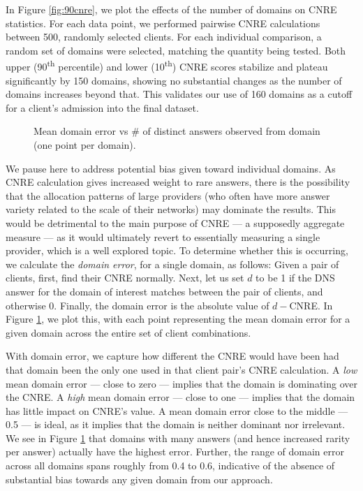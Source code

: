 In Figure \ref{fig:90cnre}, we plot the effects of the number of domains on CNRE
statistics. For each data point, we performed pairwise CNRE calculations between
500, randomly selected clients. For each individual comparison, a random set of
domains were selected, matching the quantity being tested. Both upper
(90\textsuperscript{th}
percentile) and lower (10\textsuperscript{th}) CNRE scores stabilize and plateau
significantly by 150 domains, showing no substantial changes as the
number of domains increases beyond that. This validates our use of 160 domains
as a cutoff for a client's admission into the final dataset.

\begin{figure}
    \caption{Mean domain error vs \# of distinct answers observed from domain
    (one point per domain).}
    \label{fig:domerr}
\end{figure}

We pause here to address potential bias given toward individual domains. As CNRE
calculation gives increased weight to rare answers, there is the possibility
that the allocation patterns of large providers (who often have more answer
variety related to the scale of their networks) may dominate the results. This
would be detrimental to the main purpose of CNRE --- a supposedly aggregate
measure --- as it would ultimately revert to essentially measuring a single
provider, which is a well explored topic. To determine whether this is occurring,
we calculate the \emph{domain error}, for a single domain, as follows: Given a
pair of clients, first, find their CNRE normally. Next, let us set $d$ to be 1
if the DNS answer for the domain of interest matches between the pair of
clients, and otherwise 0. Finally, the domain error is the absolute value of \(d
- \)CNRE. In Figure \ref{fig:domerr}, we plot this, with each
point representing the mean domain error for a given domain across
the entire set of client combinations. 

With domain error, we capture how different the CNRE would have
been had that domain been the only one used in that client pair's CNRE calculation. A \emph{low}
mean domain
error --- close to zero --- implies that the domain is dominating over the
CNRE. A \emph{high} mean domain error --- close to one --- implies that the domain has little impact
on CNRE's value. A mean domain error close to the middle --- 0.5 --- is ideal,
as it implies that the domain is neither dominant nor irrelevant. We see in
Figure \ref{fig:domerr} that domains with many answers (and hence increased rarity per
answer) actually have the highest error. Further, the range of domain error
across all domains spans roughly from 0.4 to 0.6, indicative of the absence of
substantial bias towards any given domain from our approach.
